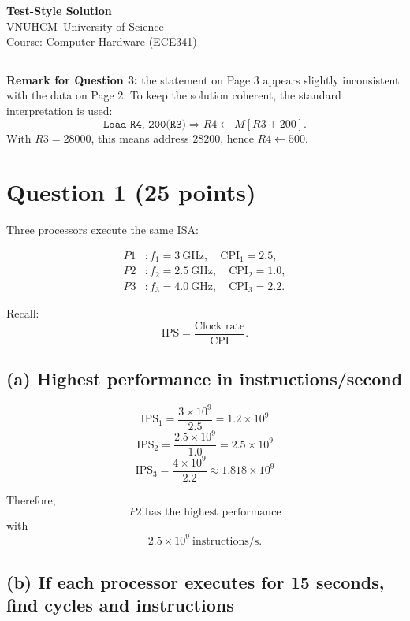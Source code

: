\documentclass[12pt,a4paper]{article}
\begin{document}
\begin{center}
    {\LARGE \textbf{Test-Style Solution}}\\[0.5em]
    {\large VNUHCM--University of Science}\\
    {\large Course: Computer Hardware (ECE341)}
\end{center}

\hrule
\vspace{1em}

\textbf{Remark for Question 3:} the statement on Page 3 appears slightly inconsistent with the data on Page 2.  
To keep the solution coherent, the standard interpretation is used:
\[
\texttt{Load R4, 200(R3)} \Rightarrow R4 \leftarrow M[R3+200].
\]
With \(R3=28000\), this means address \(28200\), hence \(R4 \leftarrow 500\).

\section*{Question 1 (25 points)}

Three processors execute the same ISA:

\[
\begin{aligned}
P1 &: f_1 = 3~\text{GHz},\quad \text{CPI}_1 = 2.5,\\
P2 &: f_2 = 2.5~\text{GHz},\quad \text{CPI}_2 = 1.0,\\
P3 &: f_3 = 4.0~\text{GHz},\quad \text{CPI}_3 = 2.2.
\end{aligned}
\]

Recall:
\[
\text{IPS} = \frac{\text{Clock rate}}{\text{CPI}}.
\]

\subsection*{(a) Highest performance in instructions/second}

\[
\text{IPS}_1=\frac{3\times 10^9}{2.5}=1.2\times 10^9
\]
\[
\text{IPS}_2=\frac{2.5\times 10^9}{1.0}=2.5\times 10^9
\]
\[
\text{IPS}_3=\frac{4\times 10^9}{2.2}\approx 1.818\times 10^9
\]

Therefore,
\[
\boxed{P2 \text{ has the highest performance}}
\]
with
\[
\boxed{2.5\times 10^9\ \text{instructions/s}}.
\]

\subsection*{(b) If each processor executes for 15 seconds, find cycles and instructions}
\end{document}
